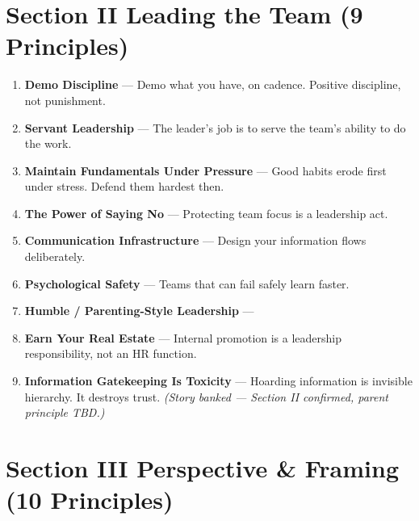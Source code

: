 \documentclass[11pt, letterpaper]{article}
\begin{document}
\section*{\color{principleblue} Section II \quad Leading the Team \quad \normalfont\small\color{midgray}(9 Principles)}
\vspace{0.5em}

\begin{enumerate}[leftmargin=2em, label=\textbf{II.\arabic*.}]
  \item \textbf{Demo Discipline} ---
        Demo what you have, on cadence. Positive discipline, not punishment.
  \item \textbf{Servant Leadership} ---
        The leader's job is to serve the team's ability to do the work.
  \item \textbf{Maintain Fundamentals Under Pressure} ---
        Good habits erode first under stress. Defend them hardest then.
  \item \textbf{The Power of Saying No} ---
        Protecting team focus is a leadership act.
  \item \textbf{Communication Infrastructure} ---
        Design your information flows deliberately.
  \item \textbf{Psychological Safety} ---
        Teams that can fail safely learn faster.
  \item \textbf{Humble / Parenting-Style Leadership} ---
  \item \textbf{Earn Your Real Estate} ---
        Internal promotion is a leadership responsibility, not an HR function.
  \item \textbf{Information Gatekeeping Is Toxicity} ---
        Hoarding information is invisible hierarchy. It destroys trust.
        \textit{(Story banked --- Section II confirmed, parent principle TBD.)}
\end{enumerate}

\vspace{1em}

\section*{\color{principleblue} Section III \quad Perspective \& Framing \quad \normalfont\small\color{midgray}(10 Principles)}
\vspace{0.5em}
\end{document}
